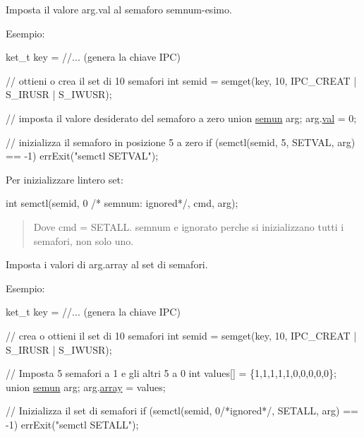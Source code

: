 Imposta il valore arg.\+val al semaforo semnum-\/esimo.

Esempio\+: 
\begin{DoxyCode}
ket\_t key = \textcolor{comment}{//... (genera la chiave IPC)}

\textcolor{comment}{// ottieni o crea il set di 10 semafori}
\textcolor{keywordtype}{int} semid = semget(key, 10, IPC\_CREAT | S\_IRUSR | S\_IWUSR);

\textcolor{comment}{// imposta il valore desiderato del semaforo a zero}
\textcolor{keyword}{union }\hyperlink{unionsemun}{semun} arg;
arg.\hyperlink{unionsemun_ac6121ecb6d04a024e07e12bd71b94031}{val} = 0;

\textcolor{comment}{// inizializza il semaforo in posizione 5 a zero}
\textcolor{keywordflow}{if} (semctl(semid, 5, SETVAL, arg) == -1)
    errExit(\textcolor{stringliteral}{"semctl SETVAL"});
\end{DoxyCode}


Per inizializzare l\textquotesingle{}intero set\+: 
\begin{DoxyCode}
\textcolor{keywordtype}{int} semctl(semid, 0 \textcolor{comment}{/* semnum: ignored*/}, cmd, arg);
\end{DoxyCode}
 \begin{quote}
Dove {\ttfamily cmd} = {\ttfamily S\+E\+T\+A\+LL}. {\ttfamily semnum} e\textquotesingle{} ignorato perche\textquotesingle{} si inizializzano tutti i semafori, non solo uno. \end{quote}


Imposta i valori di arg.\+array al set di semafori.

Esempio\+: 
\begin{DoxyCode}
ket\_t key = \textcolor{comment}{//... (genera la chiave IPC)}

\textcolor{comment}{// crea o ottieni il set di 10 semafori}
\textcolor{keywordtype}{int} semid = semget(key, 10, IPC\_CREAT | S\_IRUSR | S\_IWUSR);

\textcolor{comment}{// Imposta 5 semafori a 1 e gli altri 5 a 0}
\textcolor{keywordtype}{int} values[] = \{1,1,1,1,1,0,0,0,0,0\};
\textcolor{keyword}{union }\hyperlink{unionsemun}{semun} arg;
arg.\hyperlink{unionsemun_a1c74eb9326763d3854dc90167e1f4460}{array} = values;

\textcolor{comment}{// Inizializza il set di semafori}
\textcolor{keywordflow}{if} (semctl(semid, 0\textcolor{comment}{/*ignored*/}, SETALL, arg) == -1)
    errExit(\textcolor{stringliteral}{"semctl SETALL"});
\end{DoxyCode}



